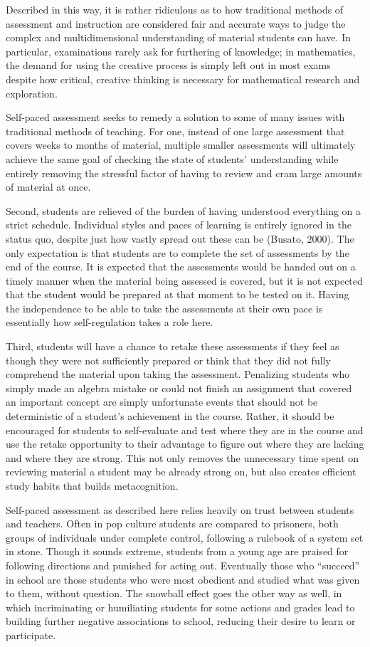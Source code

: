 Described in this way, it is rather ridiculous as to how traditional methods of assessment and instruction are considered fair and accurate ways to judge the complex and multidimensional understanding of material students can have. In particular, examinations rarely ask for furthering of knowledge; in mathematics, the demand for using the creative process is simply left out in most exams despite how critical, creative thinking is necessary for mathematical research and exploration.

Self-paced assessment seeks to remedy a solution to some of many issues with traditional methods of teaching. For one, instead of one large assessment that covers weeks to months of material, multiple smaller assessments will ultimately achieve the same goal of checking the state of students' understanding while entirely removing the stressful factor of having to review and cram large amounts of material at once.

Second, students are relieved of the burden of having understood everything on a strict schedule. Individual styles and paces of learning is entirely ignored in the status quo, despite just how vastly spread out these can be (Busato, 2000). The only expectation is that students are to complete the set of assessments by the end of the course. It is expected that the assessments would be handed out on a timely manner when the material being assessed is covered, but it is not expected that the student would be prepared at that moment to be tested on it. Having the independence to be able to take the assessments at their own pace is essentially how self-regulation takes a role here.

Third, students will have a chance to retake these assessments if they feel as though they were not sufficiently prepared or think that they did not fully comprehend the material upon taking the assessment. Penalizing students who simply made an algebra mistake or could not finish an assignment that covered an important concept are simply unfortunate events that should not be deterministic of a student's achievement in the course. Rather, it should be encouraged for students to self-evaluate and test where they are in the course and use the retake opportunity to their advantage to figure out where they are lacking and where they are strong. This not only removes the unnecessary time spent on reviewing material a student may be already strong on, but also creates efficient study habits that builds metacognition.

Self-paced assessment as described here relies heavily on trust between students and teachers. Often in pop culture students are compared to prisoners, both groups of individuals under complete control, following a rulebook of a system set in stone. Though it sounds extreme, students from a young age are praised for following directions and punished for acting out. Eventually those who ``succeed'' in school are those students who were most obedient and studied what was given to them, without question. The snowball effect goes the other way as well, in which incriminating or humiliating students for some actions and grades lead to building further negative associations to school, reducing their desire to learn or participate.

